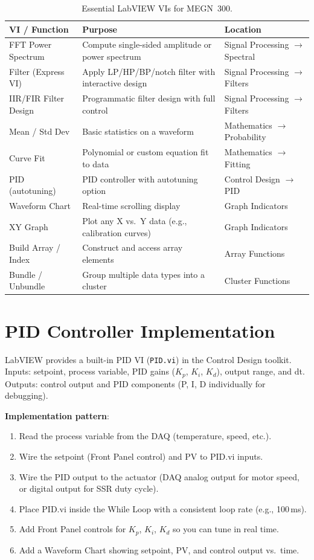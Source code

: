 \documentclass[11pt,letterpaper,twoside,openany]{book}
\begin{document}
\begin{table}[htbp]\centering\small
\begin{tabularx}{\textwidth}{l X l}
\toprule
\textbf{VI / Function} & \textbf{Purpose} & \textbf{Location} \\
\midrule
FFT Power Spectrum & Compute single-sided amplitude or power spectrum & Signal Processing $\to$ Spectral \\
Filter (Express VI) & Apply LP/HP/BP/notch filter with interactive design & Signal Processing $\to$ Filters \\
IIR/FIR Filter Design & Programmatic filter design with full control & Signal Processing $\to$ Filters \\
Mean / Std Dev & Basic statistics on a waveform & Mathematics $\to$ Probability \\
Curve Fit & Polynomial or custom equation fit to data & Mathematics $\to$ Fitting \\
PID (autotuning) & PID controller with autotuning option & Control Design $\to$ PID \\
Waveform Chart & Real-time scrolling display & Graph Indicators \\
XY Graph & Plot any X vs.\ Y data (e.g., calibration curves) & Graph Indicators \\
Build Array / Index & Construct and access array elements & Array Functions \\
Bundle / Unbundle & Group multiple data types into a cluster & Cluster Functions \\
\bottomrule
\end{tabularx}
\caption{Essential LabVIEW VIs for MEGN~300.}
\end{table}

\section*{PID Controller Implementation}
LabVIEW provides a built-in PID VI (\texttt{PID.vi}) in the Control Design toolkit. Inputs: setpoint, process variable, PID gains ($K_p$, $K_i$, $K_d$), output range, and dt. Outputs: control output and PID components (P, I, D individually for debugging).

\textbf{Implementation pattern}:
\begin{enumerate}[nosep,leftmargin=1.5em]
\item Read the process variable from the DAQ (temperature, speed, etc.).
\item Wire the setpoint (Front Panel control) and PV to PID.vi inputs.
\item Wire the PID output to the actuator (DAQ analog output for motor speed, or digital output for SSR duty cycle).
\item Place PID.vi inside the While Loop with a consistent loop rate (e.g., 100\,ms).
\item Add Front Panel controls for $K_p$, $K_i$, $K_d$ so you can tune in real time.
\item Add a Waveform Chart showing setpoint, PV, and control output vs.\ time.
\end{enumerate}
\end{document}
